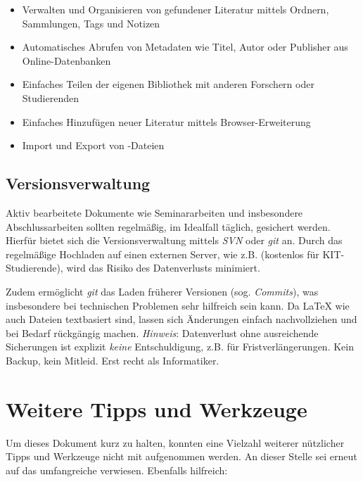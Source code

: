 \smallskip
\begin{itemize}
    \item Verwalten und Organisieren von gefundener Literatur mittels Ordnern, Sammlungen, Tags und Notizen
    \item Automatisches Abrufen von Metadaten wie Titel, Autor oder Publisher aus Online-Datenbanken
    \item Einfaches Teilen der eigenen Bibliothek mit anderen Forschern oder Studierenden
    \item Einfaches Hinzufügen neuer Literatur mittels Browser-Erweiterung
    \item Import und Export von \bibtex-Dateien
\end{itemize}

\subsection{Versionsverwaltung}%
\label{sec:Verwalten:Version}

Aktiv bearbeitete Dokumente wie Seminararbeiten und insbesondere Abschlussarbeiten sollten regelmäßig, im Idealfall täglich, gesichert werden.
Hierfür bietet sich die Versionsverwaltung mittels \emph{SVN} oder \emph{git} an.
Durch das regelmäßige Hochladen auf einen externen Server, wie z.B.  (kostenlos für KIT-Studierende), wird das Risiko des Datenverlusts minimiert.

Zudem ermöglicht \emph{git} das Laden früherer Versionen (sog. \emph{Commits}), was insbesondere bei technischen Problemen sehr hilfreich sein kann.
Da \LaTeX\- wie auch \bibtex\-Dateien textbasiert sind, lassen sich Änderungen einfach nachvollziehen und bei Bedarf rückgängig machen.
\emph{Hinweis}: Datenverlust ohne ausreichende Sicherungen ist explizit \emph{keine} Entschuldigung, z.B. für Fristverlängerungen.
Kein Backup, kein Mitleid.
Erst recht als Informatiker.

\section{Weitere Tipps und Werkzeuge}%
\label{sec:Tipps}

Um dieses Dokument kurz zu halten, konnten eine Vielzahl weiterer nützlicher Tipps und Werkzeuge nicht mit aufgenommen werden. An dieser Stelle sei erneut auf das umfangreiche  verwiesen. Ebenfalls hilfreich:


